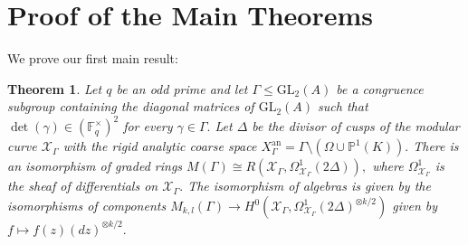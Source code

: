 \documentclass[11pt]{amsart}
\newtheorem{theorem}{Theorem}[section]
\theoremstyle{definition}
\numberwithin{equation}{section}
\newcommand{\GL}{\mathrm{GL}} 	%
\newcommand{\sX}{\mathscr{X}}		%
\newcommand{\bbF}{\mathbb{F}}		%
\newcommand{\bbP}{\mathbb{P}}		%
\begin{document}
		\section{Proof of the Main Theorems}
		
		We prove our first main result:
		
		\begin{theorem}\label{thm: forms to differentials}
			Let $q$ be an odd prime and let $\Gamma\leq \GL_2(A)$ be a congruence subgroup containing the diagonal matrices of $\GL_2(A)$ such that $\det(\gamma)\in (\bbF_q^{\times})^2$ for every $\gamma\in \Gamma.$ Let $\Delta$ be the divisor of cusps of the modular curve $\sX_{\Gamma}$ with the rigid analytic coarse space $X_{\Gamma}^{\text{an}}=\Gamma\setminus(\Omega\cup \bbP^1(K)).$ 
			There is an isomorphism of graded rings $M(\Gamma)\cong R(\sX_{\Gamma},\Omega^1_{\sX_{\Gamma}}(2\Delta)),$ where $\Omega^1_{\sX_{\Gamma}}$ is the sheaf of differentials on $\sX_{\Gamma}.$ The isomorphism of algebras is given by the isomorphisms of components $M_{k,l}(\Gamma)\to H^0(\sX_{\Gamma},\Omega^1_{\sX_{\Gamma}}(2\Delta)^{\otimes k/2})$ given by $f\mapsto f(z)(dz)^{\otimes k/2}.$ 
		\end{theorem}
\end{document}
